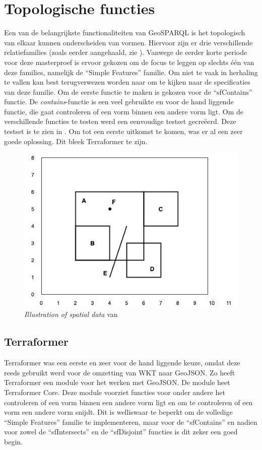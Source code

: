 \section{Topologische functies}
\label{sec:topologische_functies}
Een van de belangrijkste functionaliteiten van GeoSPARQL is het topologisch van elkaar kunnen onderscheiden van vormen. Hiervoor zijn er drie verschillende relatiefamilies (zoals eerder aangehaald, zie ). Vanwege de eerder korte periode voor deze masterproef is ervoor gekozen om de focus te leggen op slechts één van deze families, namelijk de ``Simple Features'' familie. Om niet te vaak in herhaling te vallen kan best terugverwezen worden naar  om te kijken naar de specificaties van deze familie. Om de eerste functie te maken is gekozen voor de ``sfContains'' functie. De \textit{contains}-functie is een veel gebruikte en voor de hand liggende functie, die gaat controleren of een vorm binnen een andere vorm ligt. Om de verschillende functies te testen werd een eenvoudige testset gecreëerd. Deze testset is te zien in . Om tot een eerste uitkomst te komen, was er al een zeer goede oplossing. Dit bleek Terraformer te zijn.

\begin{figure}
    \centering
    \includegraphics[width=0.5\linewidth]{images/geosparql_example.png}
    \caption{\textit{Illustration of spatial data} van \cite{ogcdocs}}
    \label{fig:illustration_spatial_data}
\end{figure}

\subsection{Terraformer}
Terraformer was een eerste en zeer voor de hand liggende keuze, omdat deze reeds gebruikt werd voor de omzetting van WKT naar GeoJSON. Zo heeft Terraformer een module voor het werken met GeoJSON. De module heet Terraformer Core. Deze module voorziet functies voor onder andere het controleren of een vorm binnen een andere vorm ligt en om te controleren of een vorm een andere vorm snijdt. Dit is welliswaar te beperkt om de volledige ``Simple Features'' familie te implementeren, maar voor de ``sfContains'' en nadien voor zowel de ``sfIntersects'' en de ``sfDisjoint'' functies is dit zeker een goed begin. 

